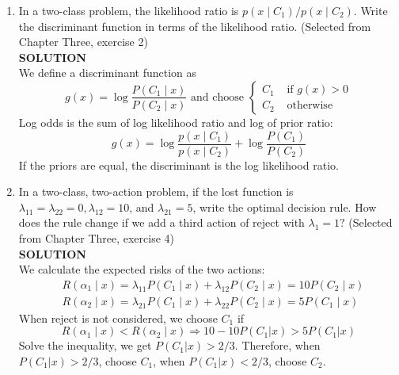 \documentclass{article}
\begin{document}
\begin{enumerate}
    \item In a two-class problem, the likelihood ratio is $p\left(x \mid C_1\right)/p\left(x \mid C_2\right)$. Write the discriminant function in terms of the likelihood ratio. (Selected from Chapter Three, exercise 2)\\
    \textbf{SOLUTION}\\
We define a discriminant function as
$$
g(x)=\log \frac{P\left(C_1 \mid x\right)}{P\left(C_2 \mid x\right)} \text { and choose } \begin{cases}C_1 & \text { if } g(x)>0 \\ C_2 & \text { otherwise }\end{cases}
$$
Log odds is the sum of log likelihood ratio and log of prior ratio:
$$
g(x)=\log \frac{p\left(x \mid C_1\right)}{p\left(x \mid C_2\right)}+\log \frac{P\left(C_1\right)}{P\left(C_2\right)}
$$
If the priors are equal, the discriminant is the log likelihood ratio.
    \item In a two-class, two-action problem, if the lost function is $\lambda_{11}=\lambda_{22}=0, \lambda_{12}=10$, and $\lambda_{21}=5$, write the optimal decision rule. How does the rule change if we add a third action of reject with $\lambda_1=1 ?$ (Selected from Chapter Three, exercise 4)\\
    \textbf{SOLUTION}\\
We calculate the expected risks of the two actions:
$$
\begin{aligned}
&R\left(\alpha_1 \mid x\right)=\lambda_{11} P\left(C_1 \mid x\right)+\lambda_{12} P\left(C_2 \mid x\right)=10 P\left(C_2 \mid x\right) \\
&R\left(\alpha_2 \mid x\right)=\lambda_{21} P\left(C_1 \mid x\right)+\lambda_{22} P\left(C_2 \mid x\right)=5P\left(C_1 \mid x\right)
\end{aligned}
$$
When reject is not considered, we choose $C_1$ if 
$$
R\left(\alpha_1 \mid x\right)<R\left(\alpha_2 \mid x\right) \Rightarrow 10-10P\left(C_1|x\right)>5P\left(C_1|x\right)
$$
Solve the inequality, we get $P(C_1|x)>2/3$. Therefore,  when $P(C_1|x)>2/3$, choose $C_1$, when $P(C_1|x)<2/3$, choose $C_2$.


\end{enumerate}
\end{document}
